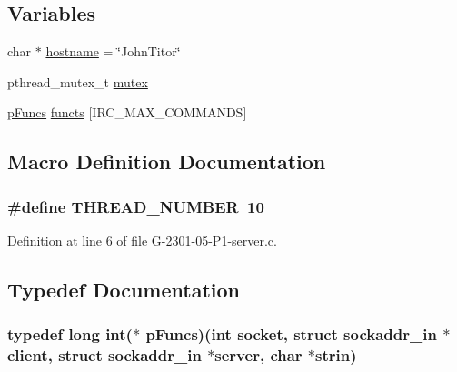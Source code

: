 \subsection*{Variables}
\begin{DoxyCompactItemize}
\item 
char $\ast$ \hyperlink{_g-2301-05-_p1-server_8c_af203df082d5c6dcaa0c88b07cf86466d}{hostname} = \char`\"{}John\-Titor\char`\"{}
\item 
pthread\-\_\-mutex\-\_\-t \hyperlink{_g-2301-05-_p1-server_8c_a4acff8232e4aec9cd5c6dc200ac55ef3}{mutex}
\item 
\hyperlink{servidor___i_r_c_8c_af4fbc62d68085a32b47e88d447b77b28}{p\-Funcs} \hyperlink{_g-2301-05-_p1-server_8c_a3b74f15bfc2af0a575608c31e269694a}{functs} \mbox{[}I\-R\-C\-\_\-\-M\-A\-X\-\_\-\-C\-O\-M\-M\-A\-N\-D\-S\mbox{]}
\end{DoxyCompactItemize}


\subsection{Macro Definition Documentation}
\hypertarget{_g-2301-05-_p1-server_8c_adc5a02a0d82a5e7fd93802b082e24102}{
\subsubsection[{T\-H\-R\-E\-A\-D\-\_\-\-N\-U\-M\-B\-E\-R}]{\setlength{\rightskip}{0pt plus 5cm}\#define T\-H\-R\-E\-A\-D\-\_\-\-N\-U\-M\-B\-E\-R~10}}\label{_g-2301-05-_p1-server_8c_adc5a02a0d82a5e7fd93802b082e24102}


Definition at line 6 of file G-\/2301-\/05-\/\-P1-\/server.\-c.



\subsection{Typedef Documentation}
\hypertarget{_g-2301-05-_p1-server_8c_af4fbc62d68085a32b47e88d447b77b28}{
\subsubsection[{p\-Funcs}]{\setlength{\rightskip}{0pt plus 5cm}typedef long int($\ast$ p\-Funcs)(int socket, struct sockaddr\-\_\-in $\ast$client, struct sockaddr\-\_\-in $\ast$server, char $\ast$strin)}}\label{_g-2301-05-_p1-server_8c_af4fbc62d68085a32b47e88d447b77b28}


